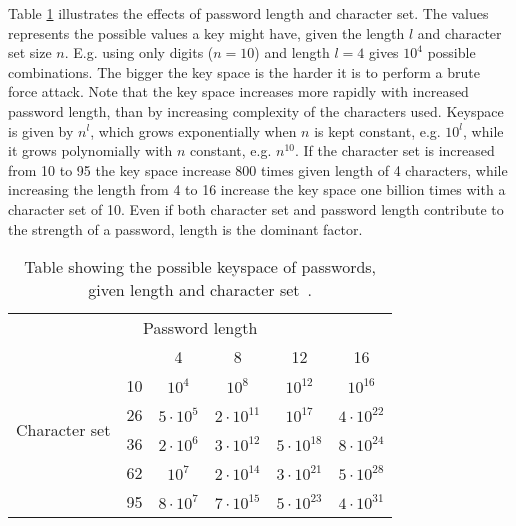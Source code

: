 Table \ref{pw-strength} illustrates the effects of password length and character set. The values represents the possible values a key might have, given the length $l$ and character set size $n$. E.g. using only digits ($n=10$) and length $l=4$ gives $10^4$ possible combinations. The bigger the key space is the harder it is to perform a brute force attack. Note that the key space increases more rapidly with increased password length, than by increasing complexity of the characters used. Keyspace is given by $n^l$, which grows exponentially when $n$ is kept constant, e.g. $10^l$, while it grows polynomially with $n$ constant, e.g. $n^{10}$. If the character set is increased from 10 to 95 the key space increase 800 times given length of 4 characters, while increasing the length from 4 to 16 increase the key space one billion times with a character set of 10. Even if both character set and password length contribute to the strength of a password, length is the dominant factor.


\begin{table}
    \centering
    \begin{tabular}{c|c|c|c|c|c|}
    \multicolumn{6}{c}{Password length}\\\cline{2-6}
    \multirow{6}{*}{\begin{sideways}Character set\end{sideways}}
      &\cellcolor{Gray}&\cellcolor{Gray}4&\cellcolor{Gray}8&\cellcolor{Gray}12&\cellcolor{Gray}16\\\cline{2-6}
    &\cellcolor{Gray}10&$10^4$&$10^8$&$10^{12}$&$10^{16}$\\\cline{2-6}
    &\cellcolor{Gray}26&$5\cdot10^5$&$2\cdot10^{11}$&$10^{17}$&$4\cdot10^{22}$\\\cline{2-6}
    &\cellcolor{Gray}36&$2\cdot 10^6$&$3\cdot10^{12}$&$5\cdot10^{18}$&$8\cdot10^{24}$\\\cline{2-6}
    &\cellcolor{Gray}62&$10^7$&$2\cdot10^{14}$&$3\cdot10^{21}$&$5\cdot10^{28}$\\\cline{2-6}
    &\cellcolor{Gray}95&$8\cdot10^7$&$7\cdot10^{15}$&$5\cdot10^{23}$&$4\cdot10^{31}$\\\cline{2-6}
    \end{tabular}
    \caption{Table showing the possible keyspace of passwords, given length and character set~\cite{nist-guide}.}
    \label{pw-strength}

\end{table}


